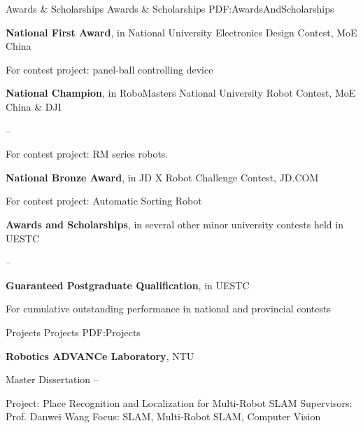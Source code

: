 \documentclass[letterpaper,MMMyyyy,nonstopmode]{simpleresumecv}
\begin{document}
\begin{Body}

\Section
{Awards \&\newline
	Scholarships}
{Awards \& Scholarships}
{PDF:AwardsAndScholarships}

\BulletItem
\textbf{National First Award},
in National  University Electronics Design Contest, 
MoE China
\hfill
{}
\begin{Detail}
	\Item
	For contest project: panel-ball controlling device
\end{Detail}

\Gap
\BulletItem
\textbf{National Champion},
in RoboMasters National University Robot Contest,
MoE China \& DJI

\hfill
{} --
\begin{Detail}
	\Item
	For contest project: RM series robots.
\end{Detail}

\Gap
\BulletItem
\textbf{National Bronze Award},
in JD X Robot Challenge Contest,
JD.COM
\hfill
{}
\begin{Detail}
	\Item
	For contest project: Automatic Sorting Robot
\end{Detail}

\Gap
\BulletItem
\textbf{Awards and Scholarships}, 
in several other minor university contests held in UESTC

\hfill
{} --

\Gap
\BulletItem
\textbf{Guaranteed Postgraduate Qualification},
in UESTC
\hfill
{}
\begin{Detail}
	\Item
	For cumulative outstanding performance in national and provincial contests
\end{Detail}


\Section
{Projects}
{Projects}
{PDF:Projects}

\Entry
{\textbf{Robotics ADVANCe Laboratory}},
NTU

\BulletItem
Master Dissertation
\hfill
{} --
\begin{Detail}
\SubBulletItem
Project:
Place Recognition and Localization for Multi-Robot SLAM
\SubBulletItem
Supervisors:
Prof. Danwei Wang
\SubBulletItem
Focus:
SLAM, Multi-Robot SLAM, Computer Vision
\end{Detail}


\end{Body}
\end{document}
